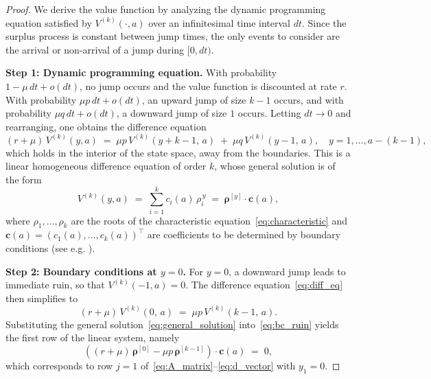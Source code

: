 \begin{proof}
We derive the value function by analyzing the dynamic programming equation satisfied
by $V^{(k)}(\cdot, a)$ over an infinitesimal time interval $dt$. Since the surplus
process is constant between jump times, the only events to consider are the arrival
or non-arrival of a jump during $[0, dt)$.

\medskip
\noindent\textbf{Step 1: Dynamic programming equation.}
With probability $1 - \mu\,dt + o(dt)$, no jump occurs and the value function is
discounted at rate $r$. With probability $\mu p\,dt + o(dt)$, an upward jump of
size $k-1$ occurs, and with probability $\mu q\,dt + o(dt)$, a downward jump of
size $1$ occurs. Letting $dt \to 0$ and rearranging, one obtains the
difference equation
\begin{equation}\label{eq:diff_eq}
    (r + \mu)\,V^{(k)}(y,a)
    \;=\;
    \mu p\,V^{(k)}(y + k - 1,\, a)
    \;+\;
    \mu q\,V^{(k)}(y - 1,\, a),
    \quad y = 1, \dots, a-(k-1),
\end{equation}
which holds in the interior of the state space, away from the boundaries.
This is a linear homogeneous difference equation of order $k$, whose general
solution is of the form
\begin{equation}\label{eq:general_solution}
    V^{(k)}(y, a) \;=\; \sum_{i=1}^{k} c_i(a)\,\rho_i^{\,y}
    \;=\; \bm{\rho}^{[y]} \cdot \mathbf{c}(a),
\end{equation}
where $\rho_1, \dots, \rho_k$ are the roots of the characteristic
equation~\eqref{eq:characteristic} and $\mathbf{c}(a) = (c_1(a), \dots, c_k(a))^\top$
are coefficients to be determined by boundary conditions (see e.g. \citet{jerri2013linear}).

\medskip
\noindent\textbf{Step 2: Boundary conditions at $y = 0$.}
For $y = 0$, a downward jump leads to immediate ruin, so that
$V^{(k)}(-1, a) = 0$. The difference equation~\eqref{eq:diff_eq} then
simplifies to
\begin{equation}\label{eq:bc_ruin}
    (r + \mu)\,V^{(k)}(0,\, a) \;=\; \mu p\,V^{(k)}(k-1,\, a).
\end{equation}
Substituting the general solution~\eqref{eq:general_solution} into~\eqref{eq:bc_ruin}
yields the first row of the linear system, namely
\begin{equation*}
    \left((r+\mu)\,\bm{\rho}^{[0]} - \mu p\,\bm{\rho}^{[k-1]}\right)
    \cdot \mathbf{c}(a) \;=\; 0,
\end{equation*}
which corresponds to row $j = 1$ of~\eqref{eq:A_matrix}--\eqref{eq:d_vector}
with $y_1 = 0$.


\end{proof}
